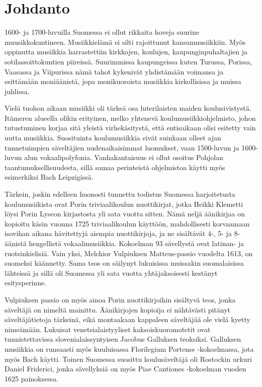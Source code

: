 \chapter*{Johdanto}

1600- ja 1700-luvuilla Suomessa ei ollut rikkaita hoveja suurine muusikkokuntineen. Musiikkielämä ei silti rajoittunut kansanmusiikkiin. Myös oppinutta musiikkia harrastettiin kirkkojen, koulujen, kaupunginpuhaltajien ja sotilassoittokuntien piireissä. Suurimmissa kaupungeissa kuten Turussa, Porissa, Vaasassa ja Viipurissa nämä tahot kykenivät yhdistämään voimansa ja esittämään moniäänistä, jopa monikuoroista musiikkia kirkollisissa ja muissa juhlissa.

Vielä tuohon aikaan musiikki oli tärkeä osa luterilaisten maiden koulusivistystä. Itämeren alueella olikin erityinen, melko yhtenevä koulumusiikkiohjelmisto, johon tutustuminen korjaa sitä yleistä virhekäsitystä, että entisaikaan olisi esitetty vain uutta musiikkia. Suosituinta koulumusiikkia eivät suinkaan olleet ajan tunnetuimpien säveltäjien uudenaikaisimmat luomukset, vaan 1500-luvun ja 1600-luvun alun vokaalipolyfonia. Vanhakantaisuus ei ollut osoitus Pohjolan taantumuksellisuudesta, sillä samaa perinteistä ohjelmistoa käytti myös esimerkiksi Bach Leipzigissä.

Tärkein, joskin edelleen huonosti tunnettu todistus Suomessa harjoitetusta koulumusiikista ovat Porin triviaalikoulun nuottikirjat, jotka Heikki Klemetti löysi Porin Lyseon kirjastosta yli sata vuotta sitten. Nämä neljä äänikirjaa on kopioitu käsin vuonna 1725 triviaalikoulun käyttöön, mahdollisesti korvaamaan isovihan aikana hävitettyjä aiempia nuottikirjoja, ja ne sisältävät 4-, 5- ja 8-äänistä hengellistä vokaalimusiikkia. Kokoelman 93 sävellystä ovat latinan- ja ruotsinkielisiä. Vain yksi, Melchior Vulpiuksen Matteus-passio vuodelta 1613, on suomeksi käännetty. Sama teos on säilynyt lukuisissa muissakin suomalaisissa lähteissä ja sillä oli Suomessa yli sata vuotta yhtäjaksoisesti kestänyt esitysperinne.

Vulpiuksen passio on myös ainoa Porin nuottikirjoihin sisältyvä teos, jonka säveltäjä on nimeltä mainittu. Äänikirjojen kopioija ei nähtävästi pitänyt säveltäjätietoja tärkeinä, eikä montaakaan kappaleen säveltäjää ole vielä kyetty nimeämään. Lukuisat venetsialaistyyliset kaksoiskuoromotetit ovat tunnistettavissa slovenialaissyntyisen Jacobus Galluksen teoksiksi. Galluksen musiikkia on runsaasti myös kuuluisassa Florilegium Portense -kokoelmassa, jota myös Bach käytti. Toinen Suomessa suosittu koulusäveltäjä oli Rostockin urkuri Daniel Friderici, jonka sävellyksiä on myös Piae Cantiones -kokoelman vuoden 1625 painoksessa.

